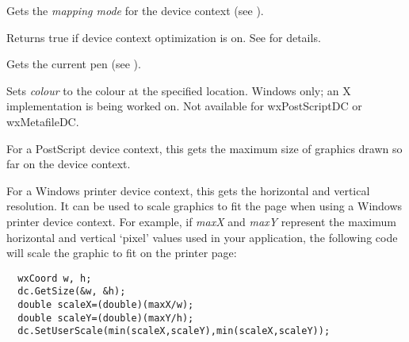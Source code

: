 
Gets the {\it mapping mode} for the device context (see ).


\label{wxdcgetoptimization}


Returns true if device context optimization is on.
See  for details.


\label{wxdcgetpen}



Gets the current pen (see ).


\label{wxdcgetpixel}


Sets {\it colour} to the colour at the specified location. Windows only; an X implementation
is being worked on. Not available for wxPostScriptDC or wxMetafileDC.




\label{wxdcgetsize}


For a PostScript device context, this gets the maximum size of graphics
drawn so far on the device context.

For a Windows printer device context, this gets the horizontal and vertical
resolution. It can be used to scale graphics to fit the page when using
a Windows printer device context. For example, if {\it maxX} and {\it maxY}\rtfsp
represent the maximum horizontal and vertical `pixel' values used in your
application, the following code will scale the graphic to fit on the
printer page:

\begin{verbatim}
  wxCoord w, h;
  dc.GetSize(&w, &h);
  double scaleX=(double)(maxX/w);
  double scaleY=(double)(maxY/h);
  dc.SetUserScale(min(scaleX,scaleY),min(scaleX,scaleY));
\end{verbatim}

